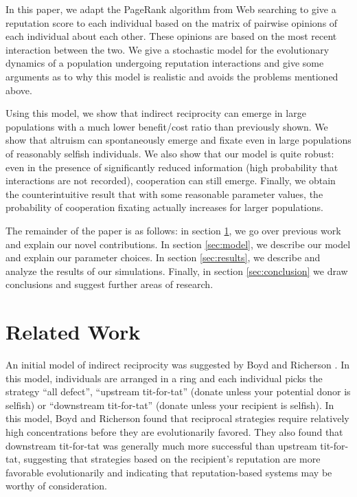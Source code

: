 \documentclass{amsart}
\begin{document}
In this paper, we adapt the PageRank algorithm from Web searching to
give a reputation score to each individual based on the matrix of
pairwise opinions of each individual about each other. These opinions
are based on the most recent interaction between the two. We give a
stochastic model for the evolutionary dynamics of a population
undergoing reputation interactions and give some arguments as to why
this model is realistic and avoids the problems mentioned above.

Using this model, we show that indirect reciprocity can emerge in
large populations with a much lower benefit/cost ratio than previously
shown. We show that altruism can spontaneously emerge and fixate even
in large populations of reasonably selfish individuals. We also show
that our model is quite robust: even in the presence of significantly
reduced information (high probability that interactions are not
recorded), cooperation can still emerge. Finally, we obtain the
counterintuitive result that with some reasonable parameter values,
the probability of cooperation fixating actually increases for larger
populations.

The remainder of the paper is as follows: in section
\ref{sec:related}, we go over previous work and explain our novel
contributions. In section \ref{sec:model}, we describe our model and
explain our parameter choices. In section \ref{sec:results}, we
describe and analyze the results of our simulations. Finally, in
section \ref{sec:conclusion} we draw conclusions and suggest further
areas of research.

\section{Related Work}\label{sec:related}

An initial model of indirect reciprocity was suggested by Boyd and
Richerson \cite{boyd_evolution_1989}. In this model, individuals are
arranged in a ring and each individual picks the strategy ``all
defect'', ``upstream tit-for-tat'' (donate unless your potential donor
is selfish) or ``downstream tit-for-tat'' (donate unless your
recipient is selfish). In this model, Boyd and Richerson found that
reciprocal strategies require relatively high concentrations before
they are evolutionarily favored. They also found that downstream
tit-for-tat was generally much more successful than upstream
tit-for-tat, suggesting that strategies based on the recipient's
reputation are more favorable evolutionarily and indicating that
reputation-based systems may be worthy of consideration.
\end{document}
